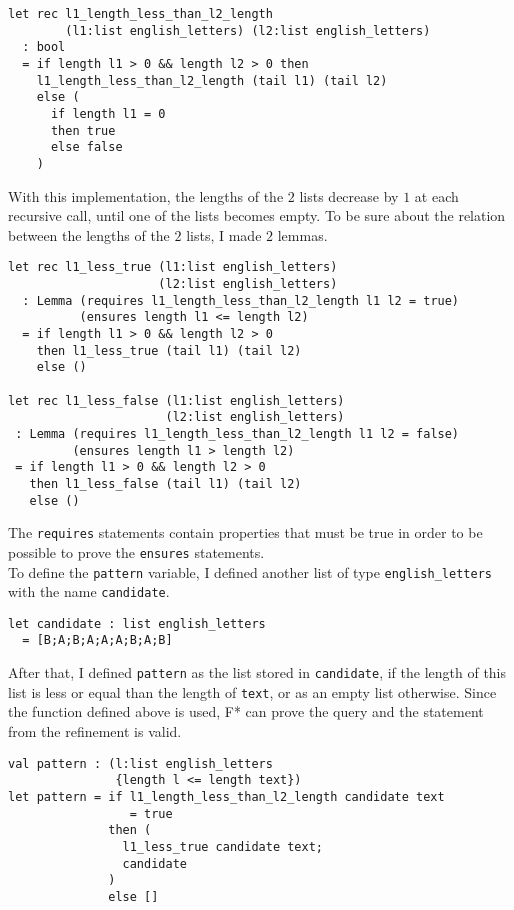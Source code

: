 \begin{verbatim}
let rec l1_length_less_than_l2_length 
        (l1:list english_letters) (l2:list english_letters)
  : bool
  = if length l1 > 0 && length l2 > 0 then
    l1_length_less_than_l2_length (tail l1) (tail l2)
    else (
      if length l1 = 0 
      then true
      else false
    )
\end{verbatim}

With this implementation, the lengths of the \(2\) lists decrease by \(1\) at each recursive call, until one of the lists becomes empty. To be sure about the relation between the lengths of the \(2\) lists, I made \(2\) lemmas.

\begin{verbatim}
let rec l1_less_true (l1:list english_letters)
                     (l2:list english_letters)
  : Lemma (requires l1_length_less_than_l2_length l1 l2 = true)
          (ensures length l1 <= length l2)
  = if length l1 > 0 && length l2 > 0
    then l1_less_true (tail l1) (tail l2)
    else ()

let rec l1_less_false (l1:list english_letters) 
                      (l2:list english_letters)
 : Lemma (requires l1_length_less_than_l2_length l1 l2 = false)
         (ensures length l1 > length l2)
 = if length l1 > 0 && length l2 > 0
   then l1_less_false (tail l1) (tail l2)
   else ()
\end{verbatim}

The \texttt{requires} statements contain properties that must be true in order to be possible to prove the \texttt{ensures} statements. \\
\indent To define the \texttt{pattern} variable, I defined another list of type \texttt{english\_letters} with the name \texttt{candidate}.

\begin{verbatim}
let candidate : list english_letters
  = [B;A;B;A;A;A;B;A;B]
\end{verbatim}

After that, I defined \texttt{pattern} as the list stored in \texttt{candidate}, if the length of this list is less or equal than the length of \texttt{text}, or as an empty list otherwise. Since the function defined above is used, F* can prove the query and the statement from the refinement is valid.

\begin{verbatim}
val pattern : (l:list english_letters
               {length l <= length text}) 
let pattern = if l1_length_less_than_l2_length candidate text 
                 = true
              then (
                l1_less_true candidate text;
                candidate
              )
              else []
\end{verbatim}

